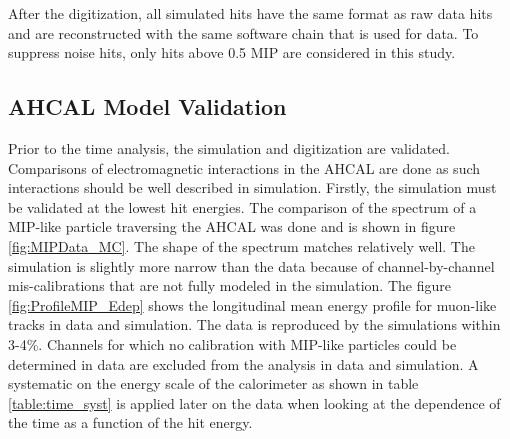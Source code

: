 \documentclass{JINST}
\begin{document}
After the digitization, all simulated hits have the same format as raw data hits and are reconstructed with the same software chain that is used for data. To suppress noise hits, only hits above 0.5 MIP are considered in this study.

\subsection{AHCAL Model Validation}

Prior to the time analysis, the simulation and digitization are validated. Comparisons of electromagnetic interactions in the AHCAL are done as such interactions should be well described in simulation. Firstly, the simulation must be validated at the lowest hit energies. The comparison of the spectrum of a MIP-like particle traversing the AHCAL was done and is shown in figure \ref{fig:MIPData_MC}. The shape of the spectrum matches relatively well. The simulation is slightly more narrow than the data because of channel-by-channel mis-calibrations that are not fully modeled in the simulation. The figure \ref{fig:ProfileMIP_Edep} shows the longitudinal mean energy profile for muon-like tracks in data and simulation. The data is reproduced by the simulations within 3-4\%. Channels for which no calibration with MIP-like particles could be determined in data are excluded from the analysis in data and simulation. A systematic on the energy scale of the calorimeter as shown in table \ref{table:time_syst} is applied later on the data when looking at the dependence of the time as a function of the hit energy.
\end{document}
